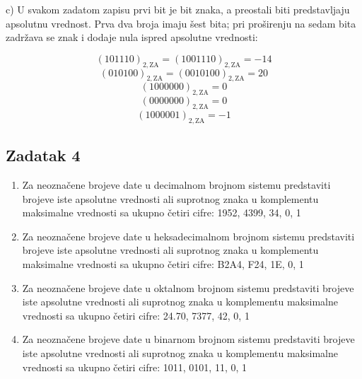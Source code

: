 \documentclass[a4paper,11pt]{article}
\numberwithin{equation}{section}
\begin{document}
c) U svakom zadatom zapisu prvi bit je bit znaka, a preostali biti predstavljaju apsolutnu vrednost. Prva dva broja imaju šest bita; pri proširenju na sedam bita zadržava se znak i dodaje nula ispred apsolutne vrednosti:

\begin{equation}\label{eq:2.3.10}
(101110)_{2,\mathrm{ZA}}=(1001110)_{2,\mathrm{ZA}}=-14
\end{equation}
\begin{equation}\label{eq:2.3.11}
(010100)_{2,\mathrm{ZA}}=(0010100)_{2,\mathrm{ZA}}=20
\end{equation}
\begin{equation}\label{eq:2.3.12}
(1000000)_{2,\mathrm{ZA}}=0
\end{equation}
\begin{equation}\label{eq:2.3.13}
(0000000)_{2,\mathrm{ZA}}=0
\end{equation}
\begin{equation}\label{eq:2.3.14}
(1000001)_{2,\mathrm{ZA}}=-1
\end{equation}


\FloatBarrier
\subsection{Zadatak 4}\label{sec:2.4}


\begin{enumerate}[label=\alph*),start=1,leftmargin=*]
\item Za neoznačene brojeve date u decimalnom brojnom sistemu predstaviti brojeve iste apsolutne vrednosti ali suprotnog znaka u komplementu maksimalne vrednosti sa ukupno četiri cifre: 1952, 4399, 34, 0, 1

\item Za neoznačene brojeve date u heksadecimalnom brojnom sistemu predstaviti brojeve iste apsolutne vrednosti ali suprotnog znaka u komplementu maksimalne vrednosti sa ukupno četiri cifre: B2A4, F24, 1E, 0, 1

\item Za neoznačene brojeve date u oktalnom brojnom sistemu predstaviti brojeve iste apsolutne vrednosti ali suprotnog znaka u komplementu maksimalne vrednosti sa ukupno četiri cifre: 24.70, 7377, 42, 0, 1

\item Za neoznačene brojeve date u binarnom brojnom sistemu predstaviti brojeve iste apsolutne vrednosti ali suprotnog znaka u komplementu maksimalne vrednosti sa ukupno četiri cifre: 1011, 0101, 11, 0, 1

\end{enumerate}
\end{document}
